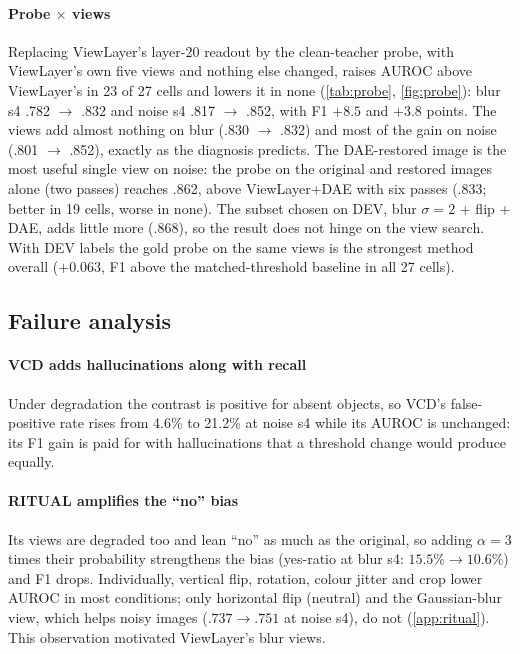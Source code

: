 \documentclass[10pt,a4paper]{article}
\newcommand{\ours}{ViewLayer}
\begin{document}
\paragraph{Probe $\times$ views} Replacing \ours{}'s layer-20 readout by the clean-teacher probe, with \ours{}'s own five views and nothing else changed, raises AUROC above \ours{}'s in 23 of 27 cells and lowers it in none (\cref{tab:probe}, \cref{fig:probe}): blur s4 .782 $\to$ .832 and noise s4 .817 $\to$ .852, with F1 $+8.5$ and $+3.8$ points. The views add almost nothing on blur (.830 $\to$ .832) and most of the gain on noise (.801 $\to$ .852), exactly as the diagnosis predicts. The DAE-restored image is the most useful single view on noise: the probe on the original and restored images alone (two passes) reaches .862, above \ours+DAE with six passes (.833; better in 19 cells, worse in none). The subset chosen on DEV, blur $\sigma{=}2$ + flip + DAE, adds little more (.868), so the result does not hinge on the view search. With DEV labels the gold probe on the same views is the strongest method overall ($+0.063$, F1 above the matched-threshold baseline in all 27 cells).

\subsection{Failure analysis}\label{sec:fail}
\paragraph{VCD adds hallucinations along with recall} Under degradation the contrast is positive for absent objects, so VCD's false-positive rate rises from 4.6\% to 21.2\% at noise s4 while its AUROC is unchanged: its F1 gain is paid for with hallucinations that a threshold change would produce equally.

\paragraph{RITUAL amplifies the ``no'' bias} Its views are degraded too and lean ``no'' as much as the original, so adding $\alpha{=}3$ times their probability strengthens the bias (yes-ratio at blur s4: $15.5\%\to10.6\%$) and F1 drops. Individually, vertical flip, rotation, colour jitter and crop lower AUROC in most conditions; only horizontal flip (neutral) and the Gaussian-blur view, which helps noisy images ($.737\to.751$ at noise s4), do not (\cref{app:ritual}). This observation motivated \ours{}'s blur views.
\end{document}
